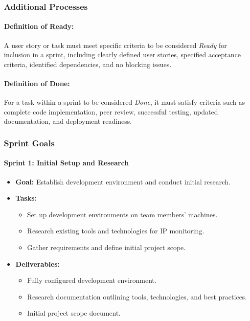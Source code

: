 \documentclass{article}
\begin{document}
    \subsubsection{Additional Processes}

    \paragraph{Definition of Ready:}
    A user story or task must meet specific criteria to be considered \textit{Ready} for inclusion in a sprint, including clearly defined user stories, specified acceptance criteria, identified dependencies, and no blocking issues.

    \paragraph{Definition of Done:}
    For a task within a sprint to be considered \textit{Done}, it must satisfy criteria such as complete code implementation, peer review, successful testing, updated documentation, and deployment readiness.

    \subsubsection{Sprint Goals}

    \paragraph{Sprint 1: Initial Setup and Research}
    \begin{itemize}
        \item \textbf{Goal:} Establish development environment and conduct initial research.
        \item \textbf{Tasks:}
        \begin{itemize}
            \item Set up development environments on team members' machines.
            \item Research existing tools and technologies for IP monitoring.
            \item Gather requirements and define initial project scope.
        \end{itemize}
        \item \textbf{Deliverables:}
        \begin{itemize}
            \item Fully configured development environment.
            \item Research documentation outlining tools, technologies, and best practices.
            \item Initial project scope document.
        \end{itemize}
    \end{itemize}
\end{document}
